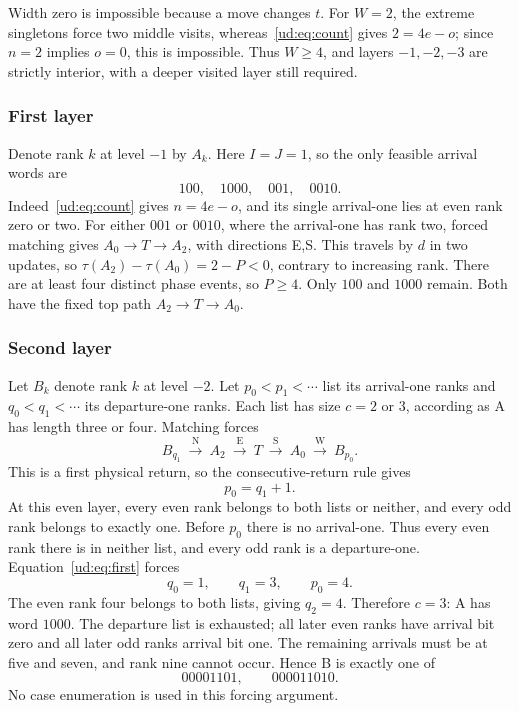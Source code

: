 Width zero is impossible because a move changes $t$. For $W=2$, the extreme
singletons force two middle visits, whereas~\eqref{ud:eq:count} gives $2=4e-o$;
since $n=2$ implies $o=0$, this is impossible. Thus $W\ge4$, and layers
$-1,-2,-3$ are strictly interior, with a deeper visited layer still required.

\subsubsection{First layer}
Denote rank $k$ at level $-1$ by $A_k$. Here $I=J=1$, so the only feasible
arrival words are
\[
 100,\quad1000,\quad001,\quad0010.
\]
Indeed~\eqref{ud:eq:count} gives $n=4e-o$, and its single arrival-one lies at
even rank zero or two. For either $001$ or $0010$, where the arrival-one has rank two, forced matching gives
$A_0\to T\to A_2$, with directions E,S. This travels by $d$ in two updates,
so $\tau(A_2)-\tau(A_0)=2-P<0$, contrary to increasing rank. There are at
least four distinct phase events, so $P\ge4$. Only $100$ and $1000$ remain.
Both have the fixed top path $A_2\to T\to A_0$.

\subsubsection{Second layer}
Let $B_k$ denote rank $k$ at level $-2$. Let $p_0<p_1<\cdots$ list its
arrival-one ranks and $q_0<q_1<\cdots$ its departure-one ranks. Each list has
size $c=2$ or $3$, according as A has length three or four. Matching forces
\[
 B_{q_1}\ \xrightarrow{\mathrm N}\ A_2
 \ \xrightarrow{\mathrm E}\ T
 \ \xrightarrow{\mathrm S}\ A_0
 \ \xrightarrow{\mathrm W}\ B_{p_0}.
\]
This is a first physical return, so the consecutive-return rule gives
\begin{equation}\label{ud:eq:first}
 p_0=q_1+1.
\end{equation}
At this even layer, every even rank belongs to both lists or neither, and
every odd rank belongs to exactly one. Before $p_0$ there is no arrival-one.
Thus every even rank there is in neither list, and every odd rank is a
departure-one. Equation~\eqref{ud:eq:first} forces
\[
 q_0=1,\qquad q_1=3,\qquad p_0=4.
\]
The even rank four belongs to both lists, giving $q_2=4$. Therefore $c=3$:
A has word $1000$. The departure list is exhausted; all later even ranks
have arrival bit zero and all later odd ranks arrival bit one. The remaining
arrivals must be at five and seven, and rank nine cannot occur. Hence B is
exactly one of
\begin{equation}\label{ud:eq:B}
 00001101,\qquad000011010.
\end{equation}
No case enumeration is used in this forcing argument.


